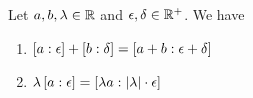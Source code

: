 \begin{theorem}
  Let $a,b,\lambda\in\R$ and $\epsilon,\delta\in\Rplus$. We have

  \begin{enumerate}
    \item $\an[\epsilon]{a}+\an[\delta]{b}=\an[\epsilon+\delta]{a+b}$
    \item $\lambda \an[\epsilon]{a} = \an[\abs{\lambda}\cdot \epsilon]{\lambda a}$
  \end{enumerate}
\end{theorem}
